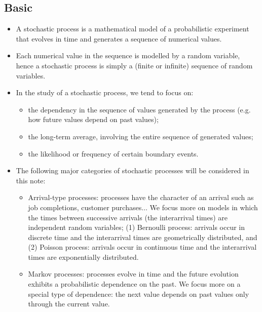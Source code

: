 \documentclass[12pt]{report}
\renewcommand{\_}{\kern-1.5pt\textunderscore\kern-1.5pt}
\begin{document}
\subsection*{Basic}
\begin{itemize}
	\item A stochastic process is a mathematical model of a probabilistic experiment that evolves in time and generates a sequence of numerical values. \par

	\item Each numerical value in the sequence is modelled by a random variable, hence a stochastic process is simply a (finite or infinite) sequence of random variables.\par

	\item In the study of a stochastic process, we tend to focus on:\par

\begin{itemize}
	\item the dependency in the sequence of values generated by the process (e.g. how future values depend on past values);\par

	\item the long-term average, involving the entire sequence of generated values;\par

	\item the likelihood or frequency of certain boundary events.\par


\end{itemize}
	\item The following major categories of stochastic processes will be considered in this note:\par

\begin{itemize}
	\item Arrival-type processes: processes have the character of an arrival such as job completions, customer purchases$ \ldots $  We focus more on models in which the times between successive arrivals (the interarrival times) are independent random variables; (1) Bernoulli process: arrivals occur in discrete time and the interarrival times are geometrically distributed, and (2) Poisson process: arrivals occur in continuous time and the interarrival times are exponentially distributed.\par

	\item Markov processes: processes evolve in time and the future evolution exhibits a probabilistic dependence on the past. We focus more on a special type of dependence: the next value depends on past values only through the current value.
\end{itemize}
\end{itemize}\par
\end{document}

